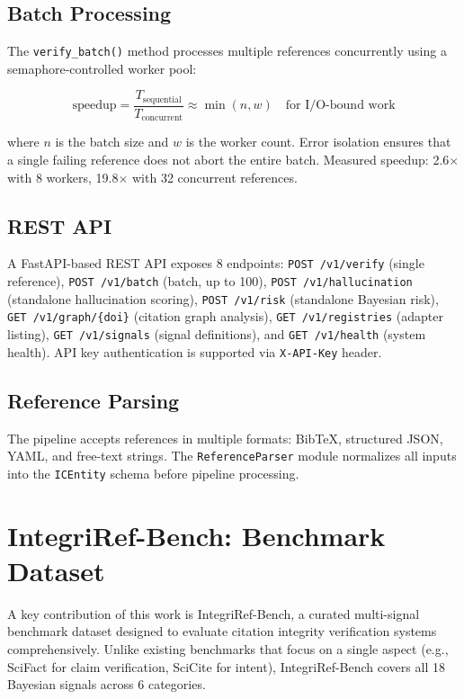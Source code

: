 \documentclass[sigconf,nonacm]{acmart}
\begin{document}
\subsection{Batch Processing}

The \texttt{verify\_batch()} method processes multiple references concurrently using a semaphore-controlled worker pool:

\begin{equation}
\text{speedup} = \frac{T_{\text{sequential}}}{T_{\text{concurrent}}} \approx \min(n, w) \quad \text{for I/O-bound work}
\label{eq:speedup}
\end{equation}

\noindent where $n$ is the batch size and $w$ is the worker count.
Error isolation ensures that a single failing reference does not abort the entire batch.
Measured speedup: 2.6$\times$ with 8 workers, 19.8$\times$ with 32 concurrent references.

\subsection{REST API}

A FastAPI-based REST API exposes 8 endpoints:
\texttt{POST /v1/verify} (single reference),
\texttt{POST /v1/batch} (batch, up to 100),
\texttt{POST /v1/hallucination} (standalone hallucination scoring),
\texttt{POST /v1/risk} (standalone Bayesian risk),
\texttt{GET /v1/graph/\{doi\}} (citation graph analysis),
\texttt{GET /v1/registries} (adapter listing),
\texttt{GET /v1/signals} (signal definitions),
and \texttt{GET /v1/health} (system health).
API key authentication is supported via \texttt{X-API-Key} header.

\subsection{Reference Parsing}

The pipeline accepts references in multiple formats: BibTeX, structured JSON, YAML, and free-text strings.
The \texttt{ReferenceParser} module normalizes all inputs into the \texttt{ICEntity} schema before pipeline processing.

\section{IntegriRef-Bench: Benchmark Dataset}
\label{sec:benchmark}

A key contribution of this work is IntegriRef-Bench, a curated multi-signal benchmark dataset designed to evaluate citation integrity verification systems comprehensively.
Unlike existing benchmarks that focus on a single aspect (e.g., SciFact for claim verification, SciCite for intent), IntegriRef-Bench covers all 18 Bayesian signals across 6 categories.
\end{document}
